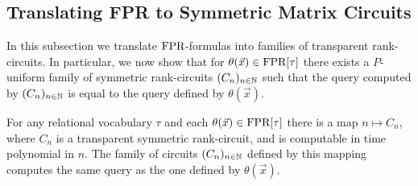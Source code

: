 \documentclass[../paper.tex]{subfiles}
\begin{document}
\subsection{Translating FPR to Symmetric Matrix Circuits}
In this subsection we translate $\text{\upshape FPR}$-formulas into families of transparent
rank-circuits. In particular, we now show that for $\theta(\vec{x}) \in
\text{\upshape FPR}[\tau]$ there exists a $P$-uniform family of symmetric rank-circuits
$(C_n)_{n \in \mathbb{N}}$ such that the query computed by $(C_n)_{n \in \mathbb{N}}$ is
equal to the query defined by $\theta (\vec{x})$.


\begin{thm}
  For any relational vocabulary $\tau$ and each $\theta(\vec{x}) \in \text{\upshape FPR}[\tau]$
  there is a map $n \mapsto C_n$, where $C_n$ is a transparent symmetric
  rank-circuit, and is computable in time polynomial in $n$. The family of
  circuits $(C_n)_{n \in \mathbb{N}}$ defined by this mapping computes the same query
  as the one defined by $\theta(\vec{x})$.
  \label{thm:translating-formulas-to-circuits}
\end{thm}
\end{document}
